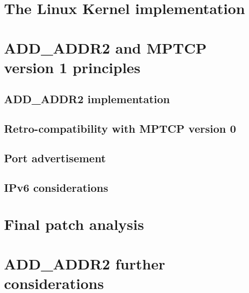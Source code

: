 \section{The Linux Kernel implementation}
\section{ADD\_ADDR2 and MPTCP version 1 principles}
\subsection{ADD\_ADDR2 implementation}
\subsection{Retro-compatibility with MPTCP version 0}
\subsection{Port advertisement}
\subsection{IPv6 considerations}
\section{Final patch analysis}
\section{ADD\_ADDR2 further considerations}

